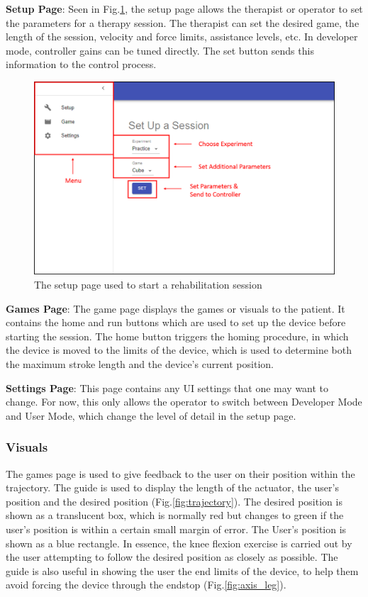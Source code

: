 \documentclass[12pt]{report}
\begin{document}
\textbf{Setup Page}: Seen in Fig.\ref{fig:ui-menu}, the setup page allows the therapist or operator to set the parameters for a therapy session. The therapist can set the desired game, the length of the session, velocity and force limits, assistance levels, etc. In developer mode, controller gains can be tuned directly. The set button sends this information to the control process. 

	\begin{figure}[h] 
		\centering
		\includegraphics[width=0.9\linewidth]{UI_menu_label}
		\caption{The setup page used to start a rehabilitation session}
		\label{fig:ui-menu}
	\end{figure} 	
		
\textbf{Games Page}: The game page displays the games or visuals to the patient. It contains the home and run buttons which are used to set up the device before starting the session. The home button triggers the homing procedure, in which the device is moved to the limits of the device, which is used to determine both the maximum stroke length and the device's current position. 

\textbf{Settings Page}: This page contains any UI settings that one may want to change. For now, this only allows the operator to switch between Developer Mode and User Mode, which change the level of detail in the setup page. 		
		
		\subsubsection{Visuals} \label{sec:visuals} 
				
		The games page is used to give feedback to the user on their position within the trajectory. The guide is used to display the length of the actuator, the user's position and the desired position (Fig.\ref{fig:trajectory}). The desired position is shown as a translucent box, which is normally red but changes to green if the user's position is within a certain small margin of error. The User's position is shown as a blue rectangle. In essence, the knee flexion exercise is carried out by the user attempting to follow the desired position as closely as possible. The guide is also useful in showing the user the end limits of the device, to help them avoid forcing the device through the endstop (Fig.\ref{fig:axis_leg}).
		
\end{document}
